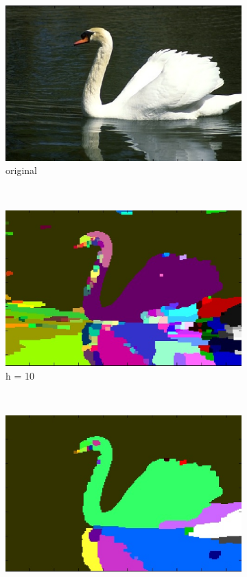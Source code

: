 \documentclass[10pt,twocolumn,letterpaper]{article}
\begin{document}
\begin{figure}
    \centering
    \begin{subfigure}[b]{0.2\textwidth}
        \includegraphics[width=\textwidth]{8068.eps}
        \caption{original}
    \end{subfigure}
    ~ 
    \begin{subfigure}[b]{0.2\textwidth}
        \includegraphics[width=\textwidth]{8068Wath10.eps}
        \caption{h = 10}
    \end{subfigure}
    ~ 
    \begin{subfigure}[b]{0.2\textwidth}
        \includegraphics[width=\textwidth]{8068Wath30.eps}

\end{subfigure}
\end{figure}
\end{document}
